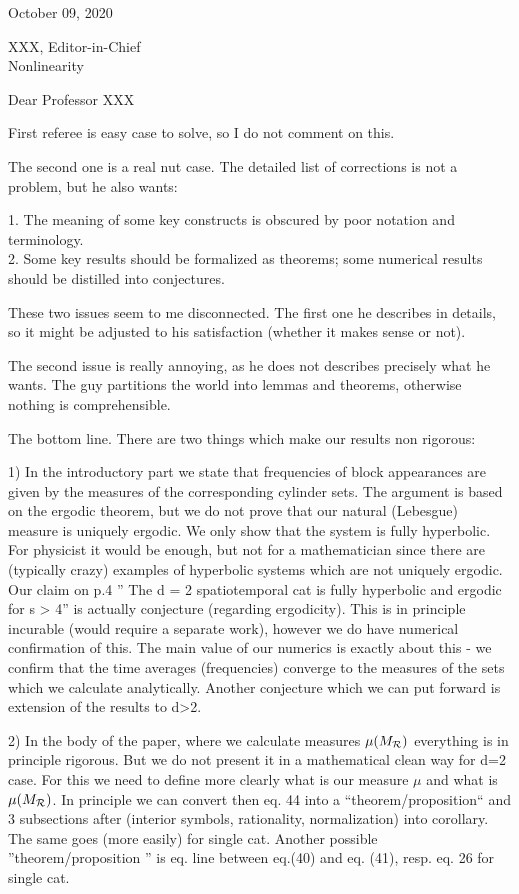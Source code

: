 \documentclass[12pt]{iopart} %
\begin{document}
\bigskip
                    \hfill October 09, 2020

\noindent
XXX, Editor-in-Chief\\
Nonlinearity

\bigskip
\bigskip

\noindent
Dear Professor XXX

\bigskip

{First referee is easy case to solve, so I do not comment on this.}

{The second one is a real nut case.
The  detailed list of corrections is not a problem, but he also wants:

1. The meaning of some key constructs is obscured by poor notation and
terminology.
    \\
2. Some key results should be formalized as theorems; some numerical
results should be distilled into conjectures.

These two issues seem to me disconnected. The first one he describes in
details, so it might be adjusted to his satisfaction (whether it makes
sense or not).

The second issue is really annoying, as he does not describes precisely
what he wants.  The guy partitions the world into lemmas and theorems,
otherwise  nothing is comprehensible.
}



The bottom line. There are two things which make our results non
rigorous:

  1)
In  the introductory part we state  that frequencies of block appearances
are given by the measures of the corresponding cylinder sets.  The
argument is based on the ergodic theorem,  but we do not prove  that  our
natural (Lebesgue) measure is uniquely ergodic. We only show that the
system is fully hyperbolic. For physicist it would be enough, but not for
a mathematician since there are (typically crazy) examples of hyperbolic
systems  which are not uniquely ergodic. Our claim on p.4 '' The d = 2
spatiotemporal cat is fully hyperbolic and ergodic for s > 4'' is
actually conjecture (regarding ergodicity). This is in principle
incurable (would require a separate work), however we do have numerical
confirmation of this. The main  value of our numerics is exactly about
this -  we confirm that the time averages (frequencies) converge to the
measures of the sets  which we calculate analytically. Another conjecture
which we can put forward is extension of the results to d>2.

2)
In the body of the paper, where we calculate measures  $\mu(M_{\mathcal{R}})$
everything is in principle rigorous. But we do not present it  in a
mathematical clean way for d=2 case. For this we need to define  more
clearly what is our measure $\mu$ and what is  $\mu(M_{\mathcal{R}})$. In principle we
can convert then eq. 44 into a  ``theorem/proposition`` and   3
subsections after (interior symbols, rationality, normalization) into
corollary. The same goes (more easily) for single cat.   Another possible
''theorem/proposition '' is eq. line between eq.(40) and eq. (41), resp.
eq. 26 for single cat.
\end{document}

